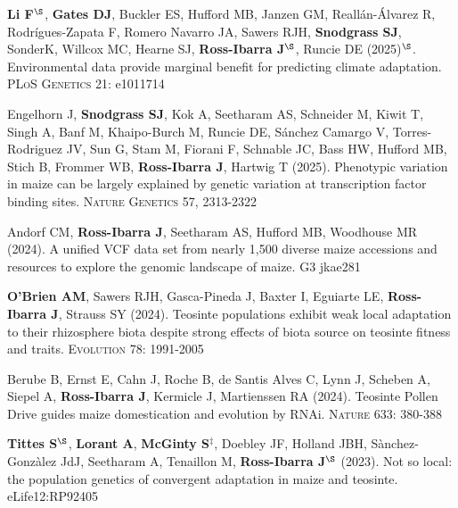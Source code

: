 \documentclass[letterpaper,10pt]{article}
\begin{document}
\begin{etaremune}
\item \textbf{Li F}$^\S$, \textbf{Gates DJ}, Buckler ES, Hufford MB, Janzen GM, Reall\'an-\'Alvarez R, Rodr\'igues-Zapata F, Romero Navarro JA, Sawers RJH, \textbf{Snodgrass SJ}, SonderK, Willcox MC, Hearne SJ, \textbf{Ross-Ibarra J}$^\S$, Runcie DE (2025)$^\S$.  Environmental data provide marginal benefit for predicting climate adaptation. \textsc{PLoS Genetics} 21: e1011714 %

\item Engelhorn J, \textbf{Snodgrass SJ}, Kok A, Seetharam AS, Schneider M, Kiwit T, Singh A, Banf M, Khaipo-Burch M, Runcie DE, Sánchez Camargo V, Torres-Rodriguez JV, Sun G, Stam M, Fiorani F, Schnable JC, Bass HW, Hufford MB, Stich B, Frommer WB, \textbf{Ross-Ibarra J}, Hartwig T (2025). Phenotypic variation in maize can be largely explained by genetic variation at transcription factor binding sites. \textsc{Nature Genetics} 57, 2313-2322 %

\item Andorf CM, \textbf{Ross-Ibarra J}, Seetharam AS, Hufford MB,  Woodhouse MR (2024). A unified VCF data set from nearly 1,500 diverse maize accessions and resources to explore the genomic landscape of maize. \textsc{G3} jkae281 %

\item \textbf{O'Brien AM},  Sawers RJH, Gasca-Pineda J, Baxter I, Eguiarte LE, \textbf{Ross-Ibarra J}, Strauss SY (2024).  Teosinte populations exhibit weak local adaptation to their rhizosphere biota despite strong effects of biota source on teosinte fitness and traits. \textsc{Evolution} 78: 1991-2005 %

\item Berube B, Ernst E, Cahn J, Roche B, de Santis Alves C, Lynn J, Scheben A, Siepel A, \textbf{Ross-Ibarra J}, Kermicle J, Martienssen RA (2024). Teosinte Pollen Drive guides maize domestication and evolution by RNAi. \textsc{Nature} 633: 380-388 %

\item \textbf{Tittes S}$^\S$, \textbf{Lorant A}, \textbf{McGinty S}$^\ddagger$, Doebley JF,  Holland JBH, S\`{a}nchez-Gonz\`{a}lez JdJ, Seetharam A, Tenaillon M, \textbf{Ross-Ibarra J}$^\S$ (2023). Not so local: the population genetics of convergent adaptation in maize and teosinte. eLife12:RP92405 %


\end{etaremune}
\end{document}
